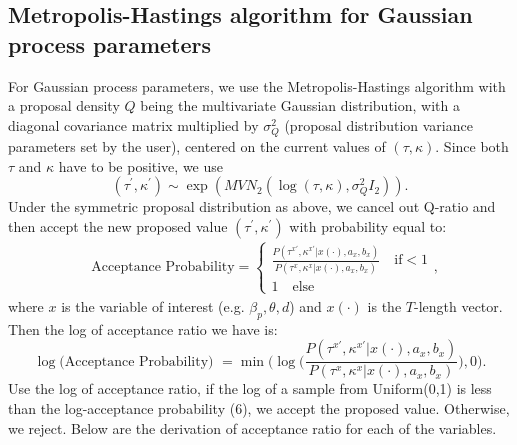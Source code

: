 \documentclass[a4paper]{article}
\begin{document}
\subsection{Metropolis-Hastings algorithm for Gaussian process parameters}
For Gaussian process parameters, we use the Metropolis-Hastings algorithm with a proposal density $Q$ being the multivariate Gaussian distribution, with a diagonal covariance matrix multiplied by $\sigma^2_Q$ (proposal distribution variance parameters set by the user), centered on the current values of $(\tau, \kappa)$. Since both $\tau$ and $\kappa$ have to be positive, we use
\begin{equation*}
(\tau^\prime, \kappa^\prime) \sim \exp(MVN_2(\log(\tau, \kappa), \sigma^2_QI_2)).
\end{equation*}
Under the symmetric proposal distribution as above, we cancel out Q-ratio and then accept the new proposed value $(\tau^\prime, \kappa^\prime)$ with probability equal to:
 \begin{equation}
 \begin{split}
 & \mbox{Acceptance Probability}=
 \begin{cases}  \frac{P(\tau^{x\prime}, \kappa^{x\prime}|x(\cdot), a_x, b_x)}{P(\tau^{x}, \kappa^{x}|x(\cdot), a_x, b_x)}\quad\text{if}  <1\\
 1 \quad \text{else}
 \end{cases},
 \end{split}
 \end{equation}
 where $x$ is the variable of interest (e.g. $\beta_p, \theta, d$) and $x(\cdot)$ is the $T$-length vector. Then the log of acceptance ratio we have is:
 \begin{equation}
\log \mbox{(Acceptance Probability) }= \min\Big( \log\Big( {\frac{P(\tau^{x\prime}, \kappa^{x\prime}|x(\cdot), a_x, b_x)}{P(\tau^{x}, \kappa^{x}|x(\cdot), a_x, b_x)}}\Big), 0\Big). 
 \end{equation}
 Use the log of acceptance ratio, if the log of a sample from Uniform(0,1) is less than the log-acceptance probability (6), we accept the proposed value. Otherwise, we reject.
 Below are the derivation of acceptance ratio for each of the variables.
\end{document}

